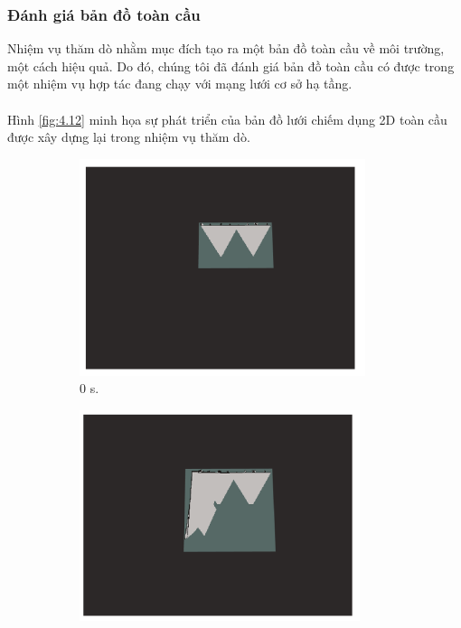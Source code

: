 \documentclass[11pt,openany]{book}
\begin{document}
\subsubsection{Đánh giá bản đồ toàn cầu}
Nhiệm vụ thăm dò nhằm mục đích tạo ra một bản đồ toàn cầu về môi trường, một cách hiệu quả. Do đó, chúng tôi đã đánh giá bản đồ toàn cầu có được trong một nhiệm vụ hợp tác đang chạy với mạng lưới cơ sở hạ tầng.\\\\
Hình \ref{fig:4.12} minh họa sự phát triển của bản đồ lưới chiếm dụng 2D toàn cầu được xây dựng lại trong nhiệm vụ thăm dò.
\begin{figure}[H]
    \centering
    \begin{subfigure}[H]{0.3\linewidth}
        \includegraphics[width=\linewidth]{assets/4_12_a.png}
        \caption{{0 s.}}
        \label{fig:4.12a}
    \end{subfigure}
    \begin{subfigure}[H]{0.3\linewidth}
        \includegraphics[width=\linewidth]{assets/4_12_b.png}

\end{subfigure}
\end{figure}
\end{document}
